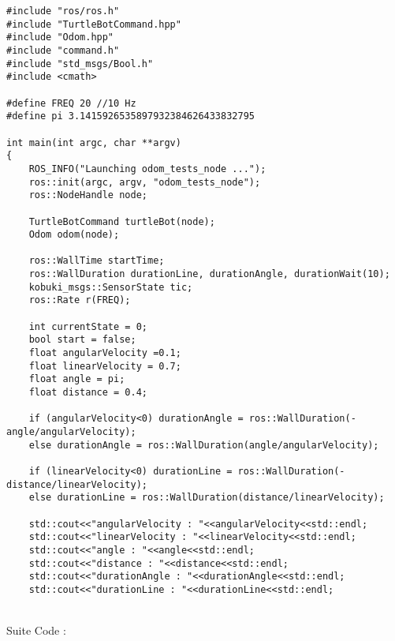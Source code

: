 \documentclass[10pt,a4paper]{article}
\newenvironment{DDbox}[1]{
\begin{lrbox}{\BBbox}\begin{minipage}{\linewidth}}
{\end{minipage}\end{lrbox}\noindent\colorbox{Zgris}{\usebox{\BBbox}} \\
[.5cm]}
\begin{document}
\begin{DDbox}{\linewidth}
\begin{lstlisting}
#include "ros/ros.h"
#include "TurtleBotCommand.hpp"
#include "Odom.hpp"
#include "command.h"
#include "std_msgs/Bool.h"
#include <cmath>

#define FREQ 20 //10 Hz
#define pi 3.1415926535897932384626433832795

int main(int argc, char **argv)
{
    ROS_INFO("Launching odom_tests_node ...");
    ros::init(argc, argv, "odom_tests_node");
    ros::NodeHandle node;

    TurtleBotCommand turtleBot(node);
	Odom odom(node);

    ros::WallTime startTime;
    ros::WallDuration durationLine, durationAngle, durationWait(10);
    kobuki_msgs::SensorState tic;
    ros::Rate r(FREQ);

    int currentState = 0;
    bool start = false;
    float angularVelocity =0.1;
    float linearVelocity = 0.7;
    float angle = pi;
    float distance = 0.4;

    if (angularVelocity<0) durationAngle = ros::WallDuration(-angle/angularVelocity);
    else durationAngle = ros::WallDuration(angle/angularVelocity);

    if (linearVelocity<0) durationLine = ros::WallDuration(-distance/linearVelocity);
    else durationLine = ros::WallDuration(distance/linearVelocity);

    std::cout<<"angularVelocity : "<<angularVelocity<<std::endl;
    std::cout<<"linearVelocity : "<<linearVelocity<<std::endl;
    std::cout<<"angle : "<<angle<<std::endl;
    std::cout<<"distance : "<<distance<<std::endl;
    std::cout<<"durationAngle : "<<durationAngle<<std::endl;
    std::cout<<"durationLine : "<<durationLine<<std::endl;
\end{lstlisting}
\end{DDbox}
Suite Code : \\
\end{document}

